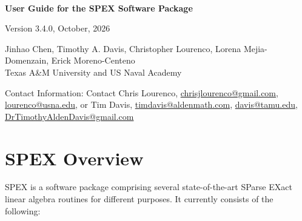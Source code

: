 \documentclass[12pt,oneside]{book}
\theoremstyle{definition}
\begin{document}
\thispagestyle{empty}
\begin{center}\begin{large}
    \phantom{.}\\[1in]
    \textbf{User Guide for the SPEX Software Package} \\
    \vspace{5mm}
    
    Version 3.4.0, October, 2026 %
    \vspace{20mm}
    
    Jinhao Chen, Timothy A. Davis, Christopher Lourenco, Lorena Mejia-Domenzain, Erick Moreno-Centeno \\
    Texas A\&M University and US Naval Academy
    \vspace{20mm}
    
    Contact Information: Contact Chris Lourenco, \href{mailto:chrisjlourenco@gmail.com}{chrisjlourenco@gmail.com}, \href{mailto:lourenco@usna.edu}{lourenco@usna.edu}, or Tim Davis,
    \href{mailto:timdavis@aldenmath.com}{timdavis@aldenmath.com},
    \href{mailto:davis@tamu.edu}{davis@tamu.edu},
    \href{mailto:DrTimothyAldenDavis@gmail.com}{DrTimothyAldenDavis@gmail.com}
\end{large}\end{center}



\newpage
\makeatletter{}\makeatother


\chapter{SPEX Overview}\vspace{-0.75in}
SPEX is a software package comprising several state-of-the-art SParse EXact
linear algebra routines for different purposes. It currently consists of the following:
\end{document}
